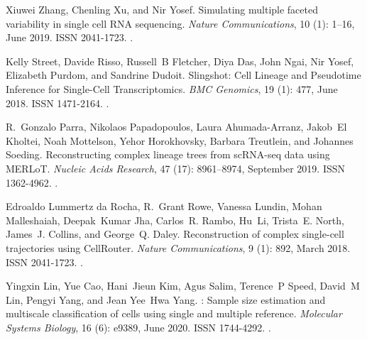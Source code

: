 \documentclass[10pt, a4paper]{article}
\begin{document}
\begin{thebibliography}{59}
	Xiuwei Zhang, Chenling Xu, and Nir Yosef.
	\newblock Simulating multiple faceted variability in single cell {{RNA}}
	sequencing.
	\newblock \emph{Nature Communications}, 10 (1): 1--16, June
	2019.
	\newblock ISSN 2041-1723.
	\newblock {}.
	
	Kelly Street, Davide Risso, Russell~B Fletcher, Diya Das, John Ngai, Nir Yosef,
	Elizabeth Purdom, and Sandrine Dudoit.
	\newblock Slingshot: {{Cell Lineage}} and {{Pseudotime Inference}} for
	{{Single}}-{{Cell Transcriptomics}}.
	\newblock \emph{BMC Genomics}, 19 (1): 477, June 2018.
	\newblock ISSN 1471-2164.
	\newblock {}.
	
	R.~Gonzalo Parra, Nikolaos Papadopoulos, Laura {Ahumada-Arranz}, Jakob~El
	Kholtei, Noah Mottelson, Yehor Horokhovsky, Barbara Treutlein, and Johannes
	Soeding.
	\newblock Reconstructing complex lineage trees from {{scRNA}}-seq data using
	{{MERLoT}}.
	\newblock \emph{Nucleic Acids Research}, 47 (17): 8961--8974,
	September 2019.
	\newblock ISSN 1362-4962.
	\newblock {}.
	
	Edroaldo {Lummertz da Rocha}, R.~Grant Rowe, Vanessa Lundin, Mohan Malleshaiah,
	Deepak~Kumar Jha, Carlos~R. Rambo, Hu~Li, Trista~E. North, James~J. Collins,
	and George~Q. Daley.
	\newblock Reconstruction of complex single-cell trajectories using
	{{CellRouter}}.
	\newblock \emph{Nature Communications}, 9 (1): 892, March
	2018.
	\newblock ISSN 2041-1723.
	\newblock {}.
	
	Yingxin Lin, Yue Cao, Hani~Jieun Kim, Agus Salim, Terence~P Speed, David~M Lin,
	Pengyi Yang, and Jean Yee~Hwa Yang.
	: Sample size estimation and multiscale classification
	of cells using single and multiple reference.
	\newblock \emph{Molecular Systems Biology}, 16 (6): e9389,
	June 2020.
	\newblock ISSN 1744-4292.
	\newblock {}.
	

\end{thebibliography}
\end{document}
